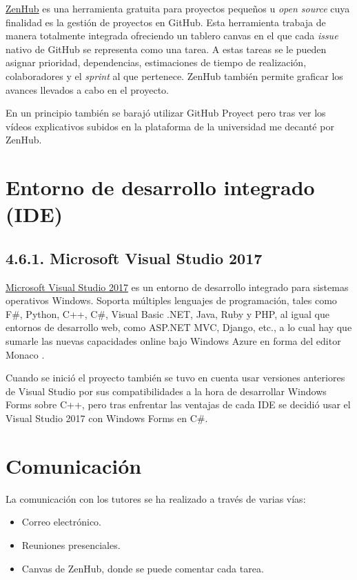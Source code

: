 \href{https://www.zenhub.com/}{ZenHub} es una herramienta gratuita para proyectos pequeños u \textit{open source} cuya finalidad es la gestión de proyectos en GitHub. Esta herramienta trabaja de manera totalmente integrada ofreciendo un tablero canvas en el que cada \textit{issue} nativo de GitHub se representa como una tarea. A estas tareas se le pueden asignar prioridad, dependencias, estimaciones de tiempo de realización, colaboradores y el \textit{sprint} al que pertenece. ZenHub también permite graficar los avances llevados a cabo en el proyecto.


En un principio también se barajó utilizar GitHub Proyect pero tras ver los vídeos explicativos subidos en la plataforma de la universidad me decanté por ZenHub.

\section{Entorno de desarrollo integrado (IDE)}

\subsection{4.6.1. Microsoft Visual Studio 2017}

\href{https://visualstudio.microsoft.com/es/vs/}{Microsoft Visual Studio 2017} es un entorno de desarrollo integrado para sistemas operativos Windows. Soporta múltiples lenguajes de programación, tales como F\#, Python, C++, C\#, Visual Basic .NET, Java, Ruby y PHP, al igual que entornos de desarrollo web, como ASP.NET MVC, Django, etc., a lo cual hay que sumarle las nuevas capacidades online bajo Windows Azure en forma del editor Monaco \cite{wiki:visualstudio}.

Cuando se inició el proyecto también se tuvo en cuenta usar versiones anteriores de Visual Studio por sus compatibilidades a la hora de desarrollar Windows Forms sobre C++, pero tras enfrentar las ventajas de cada IDE se decidió usar el Visual Studio 2017 con Windows Forms en C\#.

\section{Comunicación}

La comunicación con los tutores se ha realizado a través de varias vías:
\begin{itemize}
	\item Correo electrónico.
	\item Reuniones presenciales. 
	\item Canvas de ZenHub, donde se puede comentar cada tarea.
\end{itemize}

